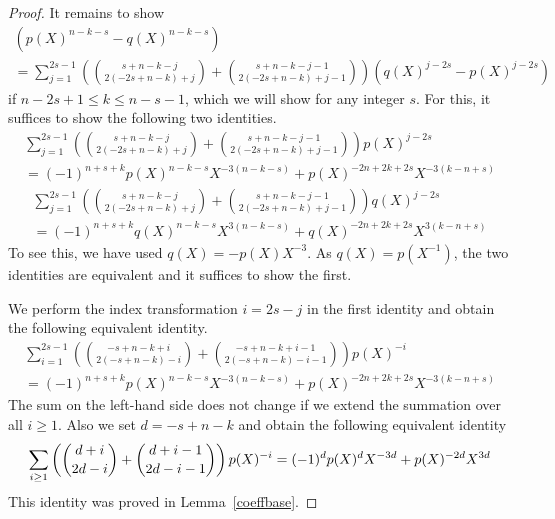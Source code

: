 \documentclass[10pt,a4paper]{amsart}
\begin{document}
\begin{proof}
It remains to show 
\begin{multline*} 
\left(p(X)^{n-k-s}-q(X)^{n-k-s} \right) \\ = \sum_{j=1}^{2s-1}  \left( \binom{s+n-k-j}{2 (-2s+n-k)+j} 
+ \binom{s+n-k-j-1}{2 (-2s+n-k)+j-1} \right) \left( q(X)^{j-2s}-p(X)^{j-2s} \right)
\end{multline*} 
if $n-2s+1 \le k \le n-s-1$, which we will show for any integer $s$. For this, it suffices to show the following two identities.
\begin{multline*} 
\sum_{j=1}^{2s-1} \left( \binom{s+n-k-j}{2(-2s+n-k)+j} + \binom{s+n-k-j-1}{2(-2s+n-k)+j-1} \right) p(X)^{j-2s} \\ = 
(-1)^{n+s+k} p(X)^{n-k-s} X^{-3(n-k-s)} + p(X)^{-2n+2k+2s} X^{-3(k-n+s)} 
\end{multline*} 
\begin{multline*} 
\sum_{j=1}^{2s-1} \left( \binom{s+n-k-j}{2(-2s+n-k)+j} + \binom{s+n-k-j-1}{2(-2s+n-k)+j-1} \right) q(X)^{j-2s} \\= 
(-1)^{n+s+k} q(X)^{n-k-s} X^{3(n-k-s)} + q(X)^{-2n+2k+2s} X^{3(k-n+s)}
\end{multline*} 
To see this, we have used $q(X)=-p(X) X^{-3}$. As $q(X)=p(X^{-1})$, the two identities are equivalent and it suffices to 
show the first.

We perform the index transformation $i=2s-j$ in the first identity and obtain the following equivalent identity.
\begin{multline*} 
\sum_{i=1}^{2s-1} \left( \binom{-s+n-k+i}{2(-s+n-k)-i} + \binom{-s+n-k+i-1}{2(-s+n-k)-i-1} \right) p(X)^{-i} \\ = 
(-1)^{n+s+k} p(X)^{n-k-s} X^{-3(n-k-s)} + p(X)^{-2n+2k+2s} X^{-3(k-n+s)}
\end{multline*} 
The sum on the left-hand side does not change if we extend the summation over all $i \ge 1$. Also we set $d=-s+n-k$ and obtain 
the following equivalent identity 
$$
\sum_{i \ge 1} \left( \binom{d+i}{2d-i} + \binom{d+i-1}{2d-i-1} \right) p(X)^{-i} \\ = 
(-1)^{d} p(X)^{d} X^{-3 d} + p(X)^{-2d} X^{3d}
$$
This identity was proved in Lemma~\ref{coeffbase}. 
\end{proof} 
\end{document}
